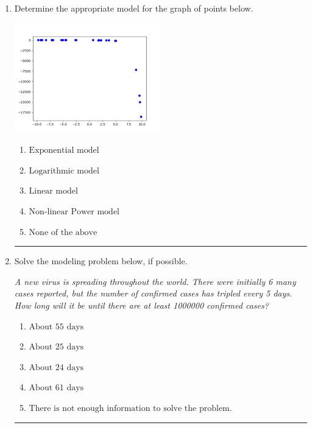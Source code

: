 \documentclass[14pt]{extbook}
\newcommand{\litem}[1]{\item#1\hspace*{-1cm}\rule{\textwidth}{0.4pt}}
\begin{document}
\begin{enumerate}
{\begin{enumerate}[label=\Alph*.]
\end{enumerate} }
\litem{
Determine the appropriate model for the graph of points below.
\begin{center}
    \includegraphics[width=0.5\textwidth]{../Figures/identifyModelGraph12B.png}
\end{center}
\begin{enumerate}[label=\Alph*.]
\item \( \text{Exponential model} \)
\item \( \text{Logarithmic model} \)
\item \( \text{Linear model} \)
\item \( \text{Non-linear Power model} \)
\item \( \text{None of the above} \)

\end{enumerate} }
\litem{
Solve the modeling problem below, if possible.
\begin{center}
    \textit{ A new virus is spreading throughout the world. There were initially 6 many cases reported, but the number of confirmed cases has tripled every 5 days. How long will it be until there are at least 1000000 confirmed cases? }
\end{center}
\begin{enumerate}[label=\Alph*.]
\item \( \text{About } 55 \text{ days} \)
\item \( \text{About } 25 \text{ days} \)
\item \( \text{About } 24 \text{ days} \)
\item \( \text{About } 61 \text{ days} \)
\item \( \text{There is not enough information to solve the problem.} \)


\end{enumerate}}
\end{enumerate}
\end{document}
